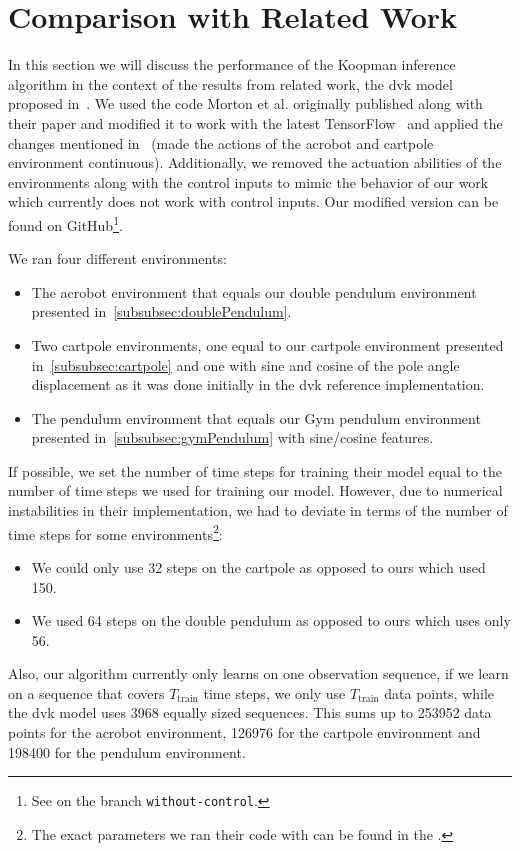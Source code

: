 \section{Comparison with Related Work}
	In this section we will discuss the performance of the Koopman inference algorithm in the context of the results from related work, the \ac{dvk} model proposed in~\cite{mortonDeepVariationalKoopman2019a}. We used the code Morton et al. originally published along with their paper and modified it to work with the latest TensorFlow~\cite{abadiTensorFlowLargeScaleMachine2016} and applied the changes mentioned in~\cite{mortonDeepVariationalKoopman2019a} (\ie made the actions of the acrobot and cartpole environment continuous). Additionally, we removed the actuation abilities of the environments along with the control inputs to mimic the behavior of our work which currently does not work with control inputs. Our modified version can be found on GitHub\footnote{See  on the branch \texttt{without-control}.}.

	We ran four different environments:
	\begin{itemize}
		\item The acrobot environment that equals our double pendulum environment presented in~\autoref{subsubsec:doublePendulum}.
		\item Two cartpole environments, one equal to our cartpole environment presented in~\autoref{subsubsec:cartpole} and one with sine and cosine of the pole angle displacement as it was done initially in the \ac{dvk} reference implementation.
		\item The pendulum environment that equals our Gym pendulum environment presented in~\autoref{subsubsec:gymPendulum} with sine/cosine features.
	\end{itemize}
	If possible, we set the number of time steps for training their model equal to the number of time steps we used for training our model. However, due to numerical instabilities in their implementation, we had to deviate in terms of the number of time steps for some environments\footnote{The exact parameters we ran their code with can be found in the .}:
	\begin{itemize}
		\item We could only use 32 steps on the cartpole as opposed to ours which used 150.
		\item We used 64 steps on the double pendulum as opposed to ours which uses only 56.
	\end{itemize}
	Also, our algorithm currently only learns on one observation sequence, \ie if we learn on a sequence that covers \(T_\text{train}\) time steps, we only use \(T_\text{train}\) data points, while the \ac{dvk} model uses \num{3968} equally sized sequences. This sums up to \num{253952} data points for the acrobot environment, \num{126976} for the cartpole environment and \num{198400} for the pendulum environment.

